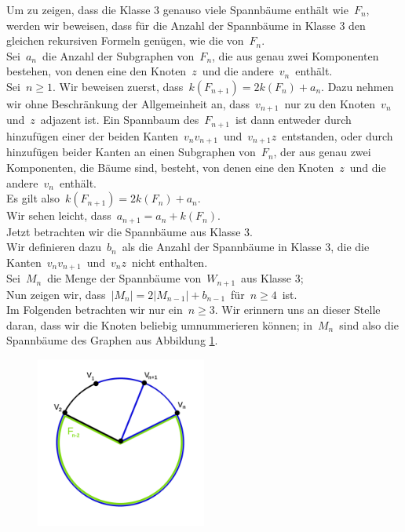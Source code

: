 Um zu zeigen, dass die Klasse 3 genauso viele Spannbäume enthält wie $\,F_n$,\; werden wir beweisen, dass für die Anzahl der Spannbäume in Klasse 3 den gleichen rekursiven Formeln genügen, wie die von $\,F_n$.\; \\
Sei $\,a_n\,$ die Anzahl der Subgraphen von $\,F_n$,\; die aus genau zwei Komponenten bestehen, von denen eine den Knoten $\,z\,$ und die andere $\,v_n\,$ enthält.\\
Sei $\,n \geq 1$.\; 
Wir beweisen zuerst, dass $\,\mathit{k}\left(F_{n+1}\right)=2\mathit{k}\left(F_{n}\right)+a_n$.\; 
Dazu nehmen wir ohne Beschränkung der Allgemeinheit an, dass $\,v_{n+1}\,$ nur zu den Knoten $\,v_n\,$ und $\,z\,$ adjazent ist. Ein Spannbaum des $\,F_{n+1}\,$ ist dann entweder durch hinzufügen einer der beiden Kanten $\,v_nv_{n+1}\,$ und $\,v_{n+1}z\,$ entstanden, oder durch hinzufügen beider Kanten an einen Subgraphen von $\,F_n$,\; der aus genau zwei Komponenten, die Bäume sind, besteht, von denen eine den Knoten $\,z\,$ und die andere $\,v_n\,$ enthält.\\
Es gilt also $\,\mathit{k}\left(F_{n+1}\right)=2\mathit{k}\left(F_{n}\right)+a_n$.\; \\
Wir sehen leicht, dass $\,a_{n+1}=a_n+\mathit{k}\left(F_n\right)$.\; \\
Jetzt betrachten wir die Spannbäume aus Klasse 3.\\
Wir definieren dazu $\,b_n\,$ als die Anzahl der Spannbäume in Klasse 3, die die Kanten $\,v_nv_{n+1}\,$ und $\,v_{n}z\,$ nicht enthalten.\\
Sei $\,M_n\,$ die Menge der Spannbäume von $\,W_{n+1}\,$ aus Klasse 3;\\
Nun zeigen wir, dass $\,|M_{n}|=2|M_{n-1}|+b_{n-1}\,$ für $\,n \geq 4\,$ ist.\\
Im Folgenden betrachten wir nur ein $\,n \geq 3$.\;  Wir erinnern uns an dieser Stelle daran, dass wir die Knoten beliebig umnummerieren können; in $\,M_{n}\,$ sind also die Spannbäume des Graphen aus Abbildung \ref{mn1}.
\begin{figure}[H]
  \centering
 \includegraphics[width=0.5\textwidth]{mn1.png}
 \caption{}
 \label{mn1} %
\end{figure}
